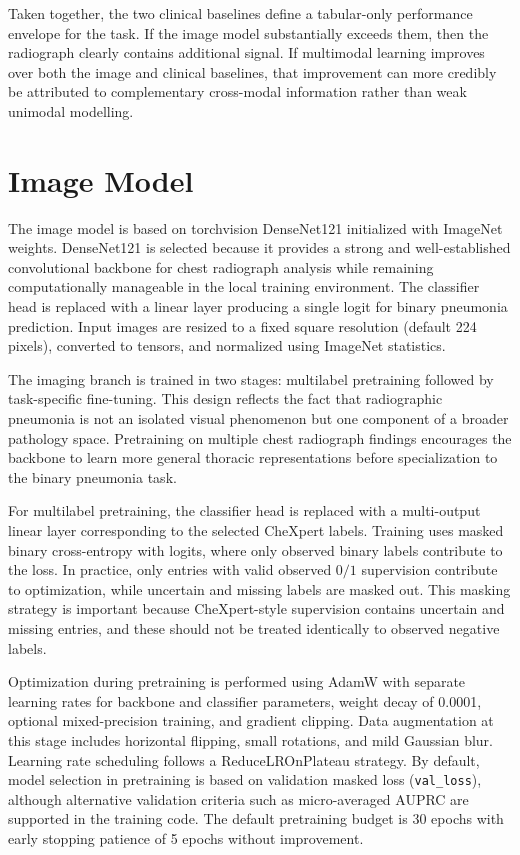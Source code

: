 Taken together, the two clinical baselines define a tabular-only performance envelope for the task. If the image model substantially exceeds them, then the radiograph clearly contains additional signal. If multimodal learning improves over both the image and clinical baselines, that improvement can more credibly be attributed to complementary cross-modal information rather than weak unimodal modelling.

\section{Image Model}

The image model is based on torchvision DenseNet121 initialized with ImageNet weights. DenseNet121 is selected because it provides a strong and well-established convolutional backbone for chest radiograph analysis while remaining computationally manageable in the local training environment. The classifier head is replaced with a linear layer producing a single logit for binary pneumonia prediction. Input images are resized to a fixed square resolution (default 224 pixels), converted to tensors, and normalized using ImageNet statistics.

The imaging branch is trained in two stages: multilabel pretraining followed by task-specific fine-tuning. This design reflects the fact that radiographic pneumonia is not an isolated visual phenomenon but one component of a broader pathology space. Pretraining on multiple chest radiograph findings encourages the backbone to learn more general thoracic representations before specialization to the binary pneumonia task.

For multilabel pretraining, the classifier head is replaced with a multi-output linear layer corresponding to the selected CheXpert labels. Training uses masked binary cross-entropy with logits, where only observed binary labels contribute to the loss. In practice, only entries with valid observed \(0/1\) supervision contribute to optimization, while uncertain and missing labels are masked out. This masking strategy is important because CheXpert-style supervision contains uncertain and missing entries, and these should not be treated identically to observed negative labels.

Optimization during pretraining is performed using AdamW with separate learning rates for backbone and classifier parameters, weight decay of 0.0001, optional mixed-precision training, and gradient clipping. Data augmentation at this stage includes horizontal flipping, small rotations, and mild Gaussian blur. Learning rate scheduling follows a ReduceLROnPlateau strategy. By default, model selection in pretraining is based on validation masked loss (\texttt{val\_loss}), although alternative validation criteria such as micro-averaged AUPRC are supported in the training code. The default pretraining budget is 30 epochs with early stopping patience of 5 epochs without improvement.

